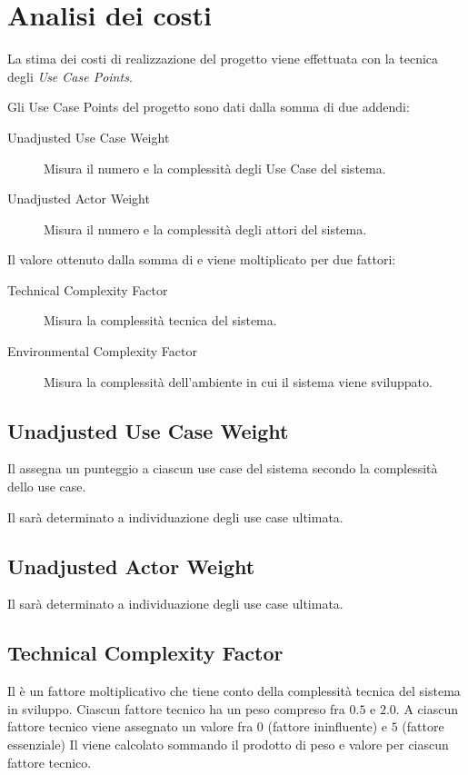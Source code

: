 \section{Analisi dei costi}


La stima dei costi di realizzazione del progetto viene effettuata con la tecnica degli \emph{Use Case Points}.

Gli Use Case Points del progetto sono dati dalla somma di due addendi:
\begin{description}
	\item[Unadjusted Use Case Weight]
		Misura il numero e la complessit\`a degli Use Case del sistema.
	\item[Unadjusted Actor Weight]
		Misura il numero e la complessit\`a degli attori del sistema.
\end{description}
Il valore ottenuto dalla somma di  e  viene moltiplicato per due fattori:
\begin{description}
	\item[Technical Complexity Factor]
		Misura la complessit\`a tecnica del sistema.
	\item[Environmental Complexity Factor]
		Misura la complessit\`a dell'ambiente in cui il sistema viene sviluppato.
\end{description}

\subsection{Unadjusted Use Case Weight}

Il  assegna un punteggio a ciascun use case del sistema secondo la complessit\`a dello use case.

Il  sar\`a determinato a individuazione degli use case ultimata.

\subsection{Unadjusted Actor Weight}

Il  sar\`a determinato a individuazione degli use case ultimata.

\subsection{Technical Complexity Factor}

Il  \`e un fattore moltiplicativo che tiene conto della complessit\`a tecnica del sistema in sviluppo.
Ciascun fattore tecnico ha un peso compreso fra $0.5$ e $2.0$.
A ciascun fattore tecnico viene assegnato un valore fra $0$ (fattore ininfluente) e $5$ (fattore essenziale)
Il  viene calcolato sommando il prodotto di peso e valore per ciascun fattore tecnico.


